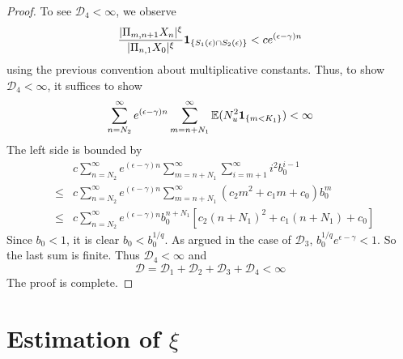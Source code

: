 \begin{proof}
To see $\mathscr D_4 < \infty$, we observe
\[
  {
    |\Pi_{m, n+1} X_n |^{\xi}
    \over
    |\Pi_{n, 1} X_0 |^{\xi}        
  } \mathbf{1}_{\{S_1(\epsilon) \cap S_2(\epsilon)\}}
  <
  c e^{(\epsilon - \gamma) n} 
\]
using the previous convention about multiplicative constants. Thus, to
show $\mathscr D_4 < \infty$, it suffices to show
\[
\sum_{n=N_2}^\infty
e^{(\epsilon - \gamma) n} 
\sum_{m=n+N_1}^\infty
\mathbb{E} (N_u^2 \mathbf{1}_{\{m < K_1\}}) < \infty
\]
The left side is bounded by
\begin{eqnarray*}
  &&
  c \sum_{n=N_2}^\infty
  e^{(\epsilon - \gamma) n} 
  \sum_{m=n+N_1}^\infty
  \sum_{i=m+1}^\infty
  i^2 b_0^{i-1} \\
  &\leq&
  c \sum_{n=N_2}^\infty
  e^{(\epsilon - \gamma) n}   
  \sum_{m=n+N_1}^\infty
  (c_2 m^2 + c_1 m + c_0) b_0^m \\
  &\leq&
  c \sum_{n=N_2}^\infty
  e^{(\epsilon - \gamma) n} b_0^{n + N_1}
  [c_2 (n + N_1)^2 + c_1 (n + N_1) + c_0]
\end{eqnarray*}
Since $b_0 < 1$, it is clear $b_0 < b_0^{1/q}$.
As argued in the case of $\mathscr D_3$,
$b_0^{1/q} e^{\epsilon - \gamma} < 1$. So the last sum is finite.
Thus $\mathscr D_4 < \infty$ and
\[
\mathscr D
=
\mathscr D_1 + \mathscr D_2 + \mathscr D_3 + \mathscr D_4
< \infty
\]
The proof is complete.
\end{proof}

\section[Estimation of xi]{Estimation of $\xi$}
